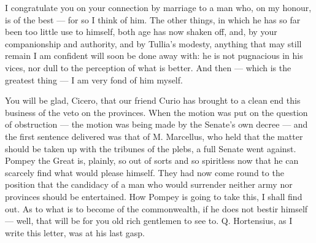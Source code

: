 

 I congratulate you on your connection by marriage to a man who, on my honour, is of the best --- for so I think of him. The other things, in which he has so far been too little use to himself, both age has now shaken off, and, by your companionship and authority, and by Tullia's modesty, anything that may still remain I am confident will soon be done away with: he is not pugnacious in his vices, nor dull to the perception of what is better. And then --- which is the greatest thing --- I am very fond of him myself.

 You will be glad, Cicero, that our friend Curio has brought to a clean end this business of the veto on the provinces. When the motion was put on the question of obstruction --- the motion was being made by the Senate's own decree --- and the first sentence delivered was that of M. Marcellus, who held that the matter should be taken up with the tribunes of the plebs, a full Senate went against. Pompey the Great is, plainly, so out of sorts and so spiritless now that he can scarcely find what would please himself. They had now come round to the position that the candidacy of a man who would surrender neither army nor provinces should be entertained. How Pompey is going to take this, I shall find out. As to what is to become of the commonwealth, if he does not bestir himself --- well, that will be for you old rich gentlemen to see to. Q. Hortensius, as I write this letter, was at his last gasp.
